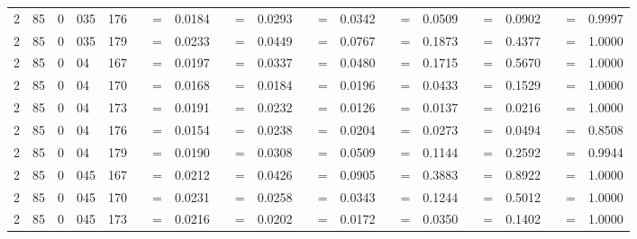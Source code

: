 \begin{tabular*}{260mm}{r@{.}lr@{.}lc|ccc:ccc:ccc:ccc:ccc|ccc}
		2&85	&	0&035	&	176	&	 &=& 0.0184 & 	 &=& 0.0293 & 	 &=& 0.0342 & 	 &=& 0.0509 & 	 &=& 0.0902 & 	 &=& 0.9997 \\ 
		2&85	&	0&035	&	179	&	 &=& 0.0233 & 	 &=& 0.0449 & 	 &=& 0.0767 & 	 &=& 0.1873 & 	 &=& 0.4377 & 	 &=& 1.0000 \\ 
		2&85	&	0&04	&	167	&	 &=& 0.0197 & 	 &=& 0.0337 & 	 &=& 0.0480 & 	 &=& 0.1715 & 	 &=& 0.5670 & 	 &=& 1.0000 \\ 
		2&85	&	0&04	&	170	&	 &=& 0.0168 & 	 &=& 0.0184 & 	 &=& 0.0196 & 	 &=& 0.0433 & 	 &=& 0.1529 & 	 &=& 1.0000 \\ 
		2&85	&	0&04	&	173	&	 &=& 0.0191 & 	 &=& 0.0232 & 	 &=& 0.0126 & 	 &=& 0.0137 & 	 &=& 0.0216 & 	 &=& 1.0000 \\ 
		2&85	&	0&04	&	176	&	 &=& 0.0154 & 	 &=& 0.0238 & 	 &=& 0.0204 & 	 &=& 0.0273 & 	 &=& 0.0494 & 	 &=& 0.8508 \\ 
		2&85	&	0&04	&	179	&	 &=& 0.0190 & 	 &=& 0.0308 & 	 &=& 0.0509 & 	 &=& 0.1144 & 	 &=& 0.2592 & 	 &=& 0.9944 \\ 
		2&85	&	0&045	&	167	&	 &=& 0.0212 & 	 &=& 0.0426 & 	 &=& 0.0905 & 	 &=& 0.3883 & 	 &=& 0.8922 & 	 &=& 1.0000 \\ 
		2&85	&	0&045	&	170	&	 &=& 0.0231 & 	 &=& 0.0258 & 	 &=& 0.0343 & 	 &=& 0.1244 & 	 &=& 0.5012 & 	 &=& 1.0000 \\ 
		2&85	&	0&045	&	173	&	 &=& 0.0216 & 	 &=& 0.0202 & 	 &=& 0.0172 & 	 &=& 0.0350 & 	 &=& 0.1402 & 	 &=& 1.0000 \\ 

\end{tabular*}
